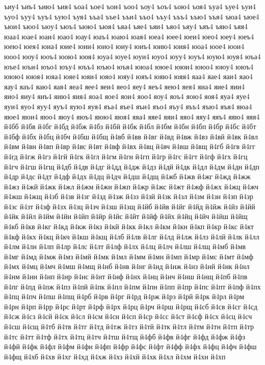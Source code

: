 {ъиу4
ъиъ4
ъию4
ъия4
ъоа4
ъое4
ъои4
ъоо4
ъоу4
ъоъ4
ъою4
ъоя4
ъуа4
ъуе4
ъуи4
ъуо4
ъуу4
ъуъ4
ъую4
ъуя4
ъъа4
ъъе4
ъъи4
ъъо4
ъъу4
ъъъ4
ъъю4
ъъя4
ъюа4
ъюе4
ъюи4
ъюо4
ъюу4
ъюъ4
ъюю4
ъюя4
ъяа4
ъяе4
ъяи4
ъяо4
ъяу4
ъяъ4
ъяю4
ъяя4
юаа4
юае4
юаи4
юао4
юау4
юаъ4
юаю4
юая4
юеа4
юее4
юеи4
юео4
юеу4
юеъ4
юею4
юея4
юиа4
юие4
юии4
юио4
юиу4
юиъ4
юию4
юия4
юоа4
юое4
юои4
юоо4
юоу4
юоъ4
юою4
юоя4
юуа4
юуе4
юуи4
юуо4
юуу4
юуъ4
юую4
юуя4
юъа4
юъе4
юъи4
юъо4
юъу4
юъъ4
юъю4
юъя4
ююа4
ююе4
ююи4
ююо4
ююу4
ююъ4
ююю4
ююя4
юяа4
юяе4
юяи4
юяо4
юяу4
юяъ4
юяю4
юяя4
яаа4
яае4
яаи4
яао4
яау4
яаъ4
яаю4
яая4
яеа4
яее4
яеи4
яео4
яеу4
яеъ4
яею4
яея4
яиа4
яие4
яии4
яио4
яиу4
яиъ4
яию4
яия4
яоа4
яое4
яои4
яоо4
яоу4
яоъ4
яою4
яоя4
яуа4
яуе4
яуи4
яуо4
яуу4
яуъ4
яую4
яуя4
яъа4
яъе4
яъи4
яъо4
яъу4
яъъ4
яъю4
яъя4
яюа4
яюе4
яюи4
яюо4
яюу4
яюъ4
яюю4
яюя4
яяа4
яяе4
яяи4
яяо4
яяу4
яяъ4
яяю4
яяя4
й4бб
й4бв
й4бг
й4бд
й4бж
й4бз
й4бй
й4бк
й4бл
й4бм
й4бн
й4бп
й4бр
й4бс
й4бт
й4бф
й4бх
й4бц
й4бч
й4бш
й4бщ
й4вб
й4вв
й4вг
й4вд
й4вж
й4вз
й4вй
й4вк
й4вл
й4вм
й4вн
й4вп
й4вр
й4вс
й4вт
й4вф
й4вх
й4вц
й4вч
й4вш
й4вщ
й4гб
й4гв
й4гг
й4гд
й4гж
й4гз
й4гй
й4гк
й4гл
й4гм
й4гн
й4гп
й4гр
й4гс
й4гт
й4гф
й4гх
й4гц
й4гч
й4гш
й4гщ
й4дб
й4дв
й4дг
й4дд
й4дж
й4дз
й4дй
й4дк
й4дл
й4дм
й4дн
й4дп
й4др
й4дс
й4дт
й4дф
й4дх
й4дц
й4дч
й4дш
й4дщ
й4жб
й4жв
й4жг
й4жд
й4жж
й4жз
й4жй
й4жк
й4жл
й4жм
й4жн
й4жп
й4жр
й4жс
й4жт
й4жф
й4жх
й4жц
й4жч
й4жш
й4жщ
й4зб
й4зв
й4зг
й4зд
й4зж
й4зз
й4зй
й4зк
й4зл
й4зм
й4зн
й4зп
й4зр
й4зс
й4зт
й4зф
й4зх
й4зц
й4зч
й4зш
й4зщ
й4йб
й4йв
й4йг
й4йд
й4йж
й4йз
й4йй
й4йк
й4йл
й4йм
й4йн
й4йп
й4йр
й4йс
й4йт
й4йф
й4йх
й4йц
й4йч
й4йш
й4йщ
й4кб
й4кв
й4кг
й4кд
й4кж
й4кз
й4кй
й4кк
й4кл
й4км
й4кн
й4кп
й4кр
й4кс
й4кт
й4кф
й4кх
й4кц
й4кч
й4кш
й4кщ
й4лб
й4лв
й4лг
й4лд
й4лж
й4лз
й4лй
й4лк
й4лл
й4лм
й4лн
й4лп
й4лр
й4лс
й4лт
й4лф
й4лх
й4лц
й4лч
й4лш
й4лщ
й4мб
й4мв
й4мг
й4мд
й4мж
й4мз
й4мй
й4мк
й4мл
й4мм
й4мн
й4мп
й4мр
й4мс
й4мт
й4мф
й4мх
й4мц
й4мч
й4мш
й4мщ
й4нб
й4нв
й4нг
й4нд
й4нж
й4нз
й4нй
й4нк
й4нл
й4нм
й4нн
й4нп
й4нр
й4нс
й4нт
й4нф
й4нх
й4нц
й4нч
й4нш
й4нщ
й4пб
й4пв
й4пг
й4пд
й4пж
й4пз
й4пй
й4пк
й4пл
й4пм
й4пн
й4пп
й4пр
й4пс
й4пт
й4пф
й4пх
й4пц
й4пч
й4пш
й4пщ
й4рб
й4рв
й4рг
й4рд
й4рж
й4рз
й4рй
й4рк
й4рл
й4рм
й4рн
й4рп
й4рр
й4рс
й4рт
й4рф
й4рх
й4рц
й4рч
й4рш
й4рщ
й4сб
й4св
й4сг
й4сд
й4сж
й4сз
й4сй
й4ск
й4сл
й4см
й4сн
й4сп
й4ср
й4сс
й4ст
й4сф
й4сх
й4сц
й4сч
й4сш
й4сщ
й4тб
й4тв
й4тг
й4тд
й4тж
й4тз
й4тй
й4тк
й4тл
й4тм
й4тн
й4тп
й4тр
й4тс
й4тт
й4тф
й4тх
й4тц
й4тч
й4тш
й4тщ
й4фб
й4фв
й4фг
й4фд
й4фж
й4фз
й4фй
й4фк
й4фл
й4фм
й4фн
й4фп
й4фр
й4фс
й4фт
й4фф
й4фх
й4фц
й4фч
й4фш
й4фщ
й4хб
й4хв
й4хг
й4хд
й4хж
й4хз
й4хй
й4хк
й4хл
й4хм
й4хн
й4хп
}
